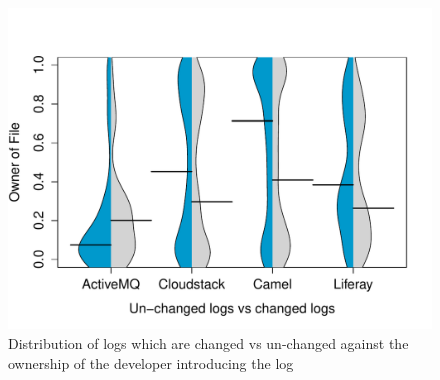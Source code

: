 \begin{figure}[tb]
\centering
\includegraphics[width=1\linewidth]{ChangedvsUnchangedlogs}
\caption{Distribution of logs which are changed vs un-changed against the ownership of the developer introducing the log}
\label{fig:ChangedvsUnchangedlogs}
\end{figure}
